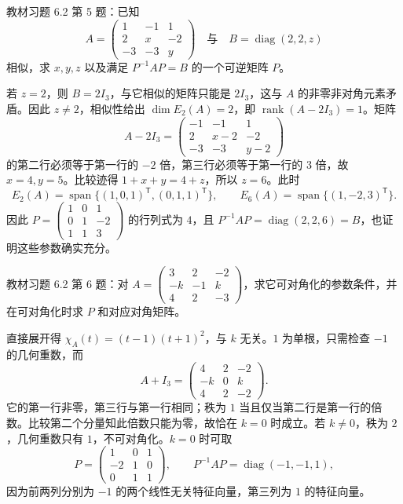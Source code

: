\begin{example}
\label{ex:xie-62-05}
教材习题 6.2 第 5 题：已知
\[
 A=\begin{pmatrix}1&-1&1\\2&x&-2\\-3&-3&y\end{pmatrix}
 \quad\text{与}\quad B=\operatorname{diag}(2,2,z)
\]
相似，求 $x,y,z$ 以及满足 $P^{-1}AP=B$ 的一个可逆矩阵 $P$。
\end{example}
\begin{solve}
若 $z=2$，则 $B=2I_3$，与它相似的矩阵只能是 $2I_3$，这与 $A$ 的非零非对角元素矛盾。因此 $z\ne2$，相似性给出 $\dim E_2(A)=2$，即 $\operatorname{rank}(A-2I_3)=1$。矩阵
\[
 A-2I_3=\begin{pmatrix}-1&-1&1\\2&x-2&-2\\-3&-3&y-2\end{pmatrix}
\]
的第二行必须等于第一行的 $-2$ 倍，第三行必须等于第一行的 $3$ 倍，故 $x=4,y=5$。比较迹得 $1+x+y=4+z$，所以 $z=6$。此时
\[
 E_2(A)=\operatorname{span}\{(1,0,1)^{\mathsf T},(0,1,1)^{\mathsf T}\},\qquad
 E_6(A)=\operatorname{span}\{(1,-2,3)^{\mathsf T}\}.
\]
因此 $P=\begin{pmatrix}1&0&1\\0&1&-2\\1&1&3\end{pmatrix}$ 的行列式为 $4$，且 $P^{-1}AP=\operatorname{diag}(2,2,6)=B$，也证明这些参数确实充分。
\end{solve}

\begin{example}
\label{ex:xie-62-06}
教材习题 6.2 第 6 题：对 $A=\begin{pmatrix}3&2&-2\\-k&-1&k\\4&2&-3\end{pmatrix}$，求它可对角化的参数条件，并在可对角化时求 $P$ 和对应对角矩阵。
\end{example}
\begin{solve}
直接展开得 $\chi_A(t)=(t-1)(t+1)^2$，与 $k$ 无关。$1$ 为单根，只需检查 $-1$ 的几何重数，而
\[
 A+I_3=\begin{pmatrix}4&2&-2\\-k&0&k\\4&2&-2\end{pmatrix}.
\]
它的第一行非零，第三行与第一行相同；秩为 $1$ 当且仅当第二行是第一行的倍数。比较第二个分量知此倍数只能为零，故恰在 $k=0$ 时成立。若 $k\ne0$，秩为 $2$，几何重数只有 $1$，不可对角化。$k=0$ 时可取
\[
 P=\begin{pmatrix}1&0&1\\-2&1&0\\0&1&1\end{pmatrix},
 \qquad P^{-1}AP=\operatorname{diag}(-1,-1,1),
\]
因为前两列分别为 $-1$ 的两个线性无关特征向量，第三列为 $1$ 的特征向量。
\end{solve}

